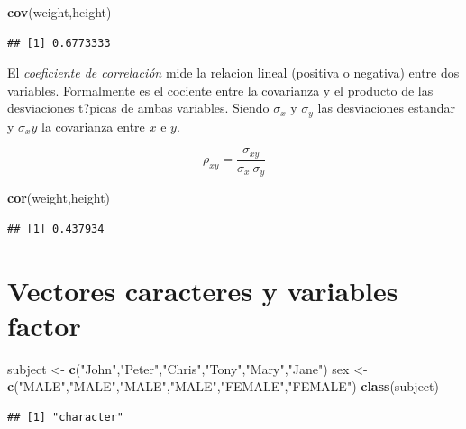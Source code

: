\documentclass[]{book}
\newenvironment{Shaded}{\begin{snugshade}}{\end{snugshade}}
\newcommand{\KeywordTok}[1]{\textcolor[rgb]{0.13,0.29,0.53}{\textbf{#1}}}
\newcommand{\StringTok}[1]{\textcolor[rgb]{0.31,0.60,0.02}{#1}}
\newcommand{\NormalTok}[1]{#1}
\begin{document}
\begin{Shaded}
\begin{Highlighting}[]
\KeywordTok{cov}\NormalTok{(weight,height)}
\end{Highlighting}
\end{Shaded}

\begin{verbatim}
## [1] 0.6773333
\end{verbatim}

El \emph{coeficiente de correlación} mide la relacion lineal (positiva o
negativa) entre dos variables. Formalmente es el cociente entre la
covarianza y el producto de las desviaciones t?picas de ambas variables.
Siendo \(\sigma_x\) y \(\sigma_y\) las desviaciones estandar y
\(\sigma_xy\) la covarianza entre \(x\) e \(y\).

\[
      \rho_{xy}  = \frac{\sigma_{xy}}{\sigma_x~\sigma_y}
\]

\begin{Shaded}
\begin{Highlighting}[]
\KeywordTok{cor}\NormalTok{(weight,height)}
\end{Highlighting}
\end{Shaded}

\begin{verbatim}
## [1] 0.437934
\end{verbatim}

\section{Vectores caracteres y variables
factor}\label{vectores-caracteres-y-variables-factor}

\begin{Shaded}
\begin{Highlighting}[]
\NormalTok{subject <-}\StringTok{ }\KeywordTok{c}\NormalTok{(}\StringTok{"John"}\NormalTok{,}\StringTok{"Peter"}\NormalTok{,}\StringTok{"Chris"}\NormalTok{,}\StringTok{"Tony"}\NormalTok{,}\StringTok{"Mary"}\NormalTok{,}\StringTok{"Jane"}\NormalTok{)}
\NormalTok{sex <-}\StringTok{ }\KeywordTok{c}\NormalTok{(}\StringTok{"MALE"}\NormalTok{,}\StringTok{"MALE"}\NormalTok{,}\StringTok{"MALE"}\NormalTok{,}\StringTok{"MALE"}\NormalTok{,}\StringTok{"FEMALE"}\NormalTok{,}\StringTok{"FEMALE"}\NormalTok{)}
\KeywordTok{class}\NormalTok{(subject)}
\end{Highlighting}
\end{Shaded}

\begin{verbatim}
## [1] "character"
\end{verbatim}
\end{document}
